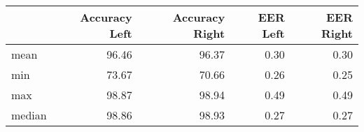 \begin{tabular}{lrrrr}
\toprule
{} &  Accuracy Left &  Accuracy Right &  EER Left &  EER Right \\
\midrule
mean   &          96.46 &           96.37 &      0.30 &       0.30 \\
min    &          73.67 &           70.66 &      0.26 &       0.25 \\
max    &          98.87 &           98.94 &      0.49 &       0.49 \\
median &          98.86 &           98.93 &      0.27 &       0.27 \\
\bottomrule
\end{tabular}
